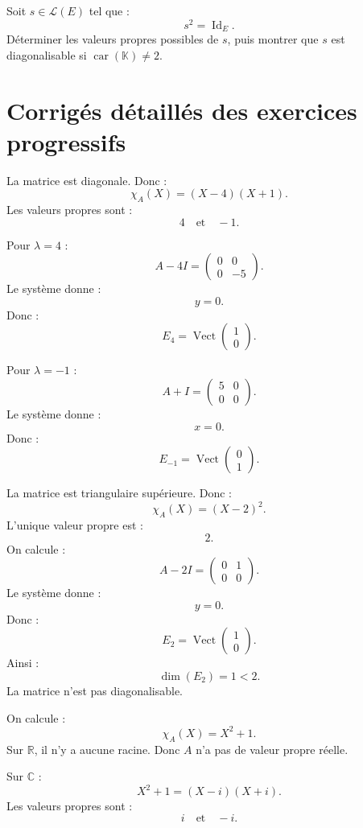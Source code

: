 \documentclass[11pt,a4paper]{article}
\newcommand{\K}{\mathbb K}
\newcommand{\R}{\mathbb R}
\newcommand{\C}{\mathbb C}
\newcommand{\Lcal}{\mathcal L}
\newcommand{\Vect}{\operatorname{Vect}}
\newcommand{\Id}{\operatorname{Id}}
\begin{document}
\begin{exercicebox}[12]
Soit \(s\in\Lcal(E)\) tel que :
\[
s^2=\Id_E.
\]
Déterminer les valeurs propres possibles de \(s\), puis montrer que \(s\) est diagonalisable si \(\operatorname{car}(\K)\neq2\).
\end{exercicebox}

\newpage
\section{Corrigés détaillés des exercices progressifs}

\begin{correctionbox}[1]
La matrice est diagonale.  
Donc :
\[
\chi_A(X)=(X-4)(X+1).
\]
Les valeurs propres sont :
\[
4
\quad\text{et}\quad
-1.
\]

Pour \(\lambda=4\) :
\[
A-4I=
\begin{pmatrix}
0&0\\
0&-5
\end{pmatrix}.
\]
Le système donne :
\[
y=0.
\]
Donc :
\[
E_4=\Vect
\begin{pmatrix}
1\\0
\end{pmatrix}.
\]

Pour \(\lambda=-1\) :
\[
A+I=
\begin{pmatrix}
5&0\\
0&0
\end{pmatrix}.
\]
Le système donne :
\[
x=0.
\]
Donc :
\[
E_{-1}=\Vect
\begin{pmatrix}
0\\1
\end{pmatrix}.
\]
\end{correctionbox}

\begin{correctionbox}[2]
La matrice est triangulaire supérieure.  
Donc :
\[
\chi_A(X)=(X-2)^2.
\]
L'unique valeur propre est :
\[
2.
\]
On calcule :
\[
A-2I=
\begin{pmatrix}
0&1\\
0&0
\end{pmatrix}.
\]
Le système donne :
\[
y=0.
\]
Donc :
\[
E_2=\Vect
\begin{pmatrix}
1\\0
\end{pmatrix}.
\]
Ainsi :
\[
\dim(E_2)=1<2.
\]
La matrice n'est pas diagonalisable.
\end{correctionbox}

\begin{correctionbox}[3]
On calcule :
\[
\chi_A(X)=X^2+1.
\]
Sur \(\R\), il n'y a aucune racine.  
Donc \(A\) n'a pas de valeur propre réelle.

Sur \(\C\) :
\[
X^2+1=(X-i)(X+i).
\]
Les valeurs propres sont :
\[
i
\quad\text{et}\quad
-i.
\]
\end{correctionbox}
\end{document}
